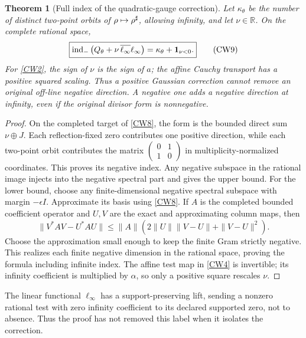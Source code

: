 \documentclass[11pt,a4paper]{article}
\newtheorem{theorem}{Theorem}[section]
\theoremstyle{definition}\newtheorem{definition}[theorem]{Definition}
\begin{document}
\begin{theorem}[Full index of the quadratic-gauge correction]
Let $\kappa_\theta$ be the number of distinct two-point orbits of $\rho\mapsto\rho^\sharp$, allowing infinity, and let $\nu\in\mathbb R$. On the complete rational space,
\begin{equation}
 \boxed{\operatorname{ind}_-\left(Q_\theta+
\nu\,\overline{\ell_\infty}\ell_\infty\right)
       =\kappa_\theta+\mathbf1_{\nu<0}.}                      \tag{CW9}\label{CW9}
\end{equation}
For \eqref{CW2}, the sign of $\nu$ is the sign of $a$; the affine Cauchy transport has a positive squared scaling. Thus a positive Gaussian correction cannot remove an original off-line negative direction. A negative one adds a negative direction at infinity, even if the original divisor form is nonnegative.
\end{theorem}
\begin{proof}
On the completed target of \eqref{CW8}, the form is the bounded direct sum $\nu\oplus J$. Each reflection-fixed zero contributes one positive direction, while each two-point orbit contributes the matrix $\left(\begin{smallmatrix}0&1\\1&0\end{smallmatrix}\right)$ in multiplicity-normalized coordinates. This proves its negative index. Any negative subspace in the rational image injects into the negative spectral part and gives the upper bound. For the lower bound, choose any finite-dimensional negative spectral subspace with margin $-\epsilon I$. Approximate its basis using \eqref{CW8}. If $A$ is the completed bounded coefficient operator and $U,V$ are the exact and approximating column maps, then
\[
 \|V^*AV-U^*AU\|\le\|A\|
 (2\|U\|\|V-U\|+\|V-U\|^2).
\]
Choose the approximation small enough to keep the finite Gram strictly negative. This realizes each finite negative dimension in the rational space, proving the formula including infinite index. The affine test map in \eqref{CW4} is invertible; its infinity coefficient is multiplied by $\alpha$, so only a positive square rescales $\nu$.
\end{proof}

The linear functional $\ell_\infty$ has a support-preserving lift, sending a nonzero rational test with zero infinity coefficient to its declared supported zero, not to absence. Thus the proof has not removed this label when it isolates the correction.
\end{document}
